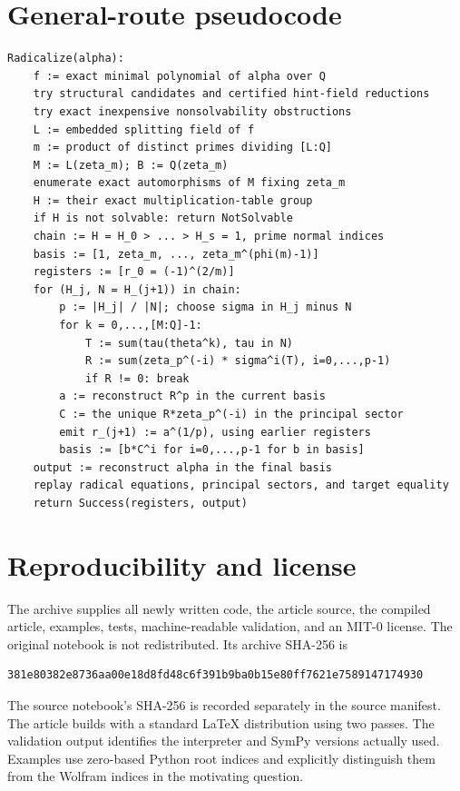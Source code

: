 \documentclass[11pt,letterpaper]{article}
\theoremstyle{definition}\newtheorem{definition}[theorem]{Definition}
\theoremstyle{remark}\newtheorem{remark}[theorem]{Remark}
\begin{document}
\appendix
\section{General-route pseudocode}
\begin{lstlisting}[basicstyle=\ttfamily\footnotesize]
Radicalize(alpha):
    f := exact minimal polynomial of alpha over Q
    try structural candidates and certified hint-field reductions
    try exact inexpensive nonsolvability obstructions
    L := embedded splitting field of f
    m := product of distinct primes dividing [L:Q]
    M := L(zeta_m); B := Q(zeta_m)
    enumerate exact automorphisms of M fixing zeta_m
    H := their exact multiplication-table group
    if H is not solvable: return NotSolvable
    chain := H = H_0 > ... > H_s = 1, prime normal indices
    basis := [1, zeta_m, ..., zeta_m^(phi(m)-1)]
    registers := [r_0 = (-1)^(2/m)]
    for (H_j, N = H_(j+1)) in chain:
        p := |H_j| / |N|; choose sigma in H_j minus N
        for k = 0,...,[M:Q]-1:
            T := sum(tau(theta^k), tau in N)
            R := sum(zeta_p^(-i) * sigma^i(T), i=0,...,p-1)
            if R != 0: break
        a := reconstruct R^p in the current basis
        C := the unique R*zeta_p^(-i) in the principal sector
        emit r_(j+1) := a^(1/p), using earlier registers
        basis := [b*C^i for i=0,...,p-1 for b in basis]
    output := reconstruct alpha in the final basis
    replay radical equations, principal sectors, and target equality
    return Success(registers, output)
\end{lstlisting}

\section{Reproducibility and license}
The archive supplies all newly written code, the article source, the compiled
article, examples, tests, machine-readable validation, and an MIT-0 license.
The original notebook is not redistributed. Its archive SHA-256 is
\begin{lstlisting}
381e80382e8736aa00e18d8fd48c6f391b9ba0b15e80ff7621e7589147174930
\end{lstlisting}
The source notebook's SHA-256 is recorded separately in the source manifest.
The article builds with a standard LaTeX distribution using two
 passes. The validation output identifies the interpreter and
SymPy versions actually used. Examples use zero-based Python root indices and
explicitly distinguish them from the Wolfram indices in the motivating question.
\end{document}
